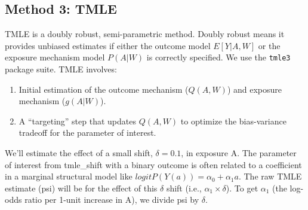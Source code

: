 \documentclass[
]{article}
\providecommand{\tightlist}{%
  \setlength{\itemsep}{0pt}\setlength{\parskip}{0pt}}
\begin{document}
\subsection{Method 3: TMLE}\label{method-3-tmle}

TMLE is a doubly robust, semi-parametric method. Doubly robust means it
provides unbiased estimates if either the outcome model \(E[Y|A,W]\) or
the exposure mechanism model \(P(A|W)\) is correctly specified. We use
the \texttt{tmle3} package suite. TMLE involves:

\begin{enumerate}
\def\labelenumi{\arabic{enumi}.}
\tightlist
\item
  Initial estimation of the outcome mechanism (\(Q(A,W)\)) and exposure
  mechanism (\(g(A|W)\)).
\item
  A ``targeting'' step that updates \(Q(A,W)\) to optimize the
  bias-variance tradeoff for the parameter of interest.
\end{enumerate}

We'll estimate the effect of a small shift, \(\delta=0.1\), in exposure
A. The parameter of interest from tmle\_shift with a binary outcome is
often related to a coefficient in a marginal structural model like
\(logit P(Y(a)) = \alpha_0 + \alpha_1 a\). The raw TMLE estimate (psi)
will be for the effect of this \(\delta\) shift (i.e.,
\(\alpha_1 \times \delta\)). To get \(\alpha_1\) (the log-odds ratio per
1-unit increase in A), we divide psi by \(\delta\).
\end{document}
